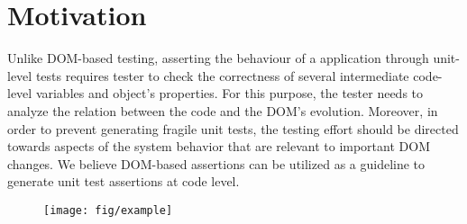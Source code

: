 \section{Motivation} \label{Sec:motivation}
Unlike DOM-based testing, asserting the behaviour of a \javascript application through unit-level tests requires tester to check the correctness of several intermediate code-level variables and object's properties. For this purpose, the tester needs to analyze the relation between the \javascript code and the DOM's evolution. Moreover, in order to prevent generating fragile unit tests, the testing effort should be directed towards aspects of the system behavior that are relevant to important DOM changes. We believe DOM-based assertions can be utilized as a guideline to generate unit test assertions at \javascript code level. 

\begin{figure}[!t]
  \centering
  \texttt{[image: fig/example]}
  \vspace{-0.2in} 
  \label{Fig:example}
\end{figure}

